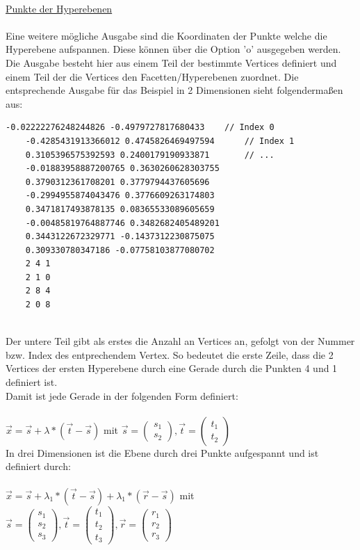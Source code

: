 \documentclass[12pt]{scrartcl}
\begin{document}
\ \\
\underline{Punkte der Hyperebenen}\\~\\
Eine weitere mögliche Ausgabe sind die Koordinaten der Punkte welche die Hyperebene aufspannen. Diese können über die Option 'o' ausgegeben werden. Die Ausgabe besteht hier aus einem Teil der bestimmte Vertices definiert und einem Teil der die Vertices den Facetten/Hyperebenen zuordnet. Die entsprechende Ausgabe für das Beispiel in 2 Dimensionen sieht folgendermaßen aus:

\begin{lstlisting}[style=Terminal, caption={Ausgabe von qconvex mit Option 'o'},captionpos=b]
    -0.02222276248244826 -0.4979727817680433    // Index 0
    -0.4285431913366012 0.4745826469497594      // Index 1
    0.3105396575392593 0.2400179190933871       // ...
    -0.01883958887200765 0.3630260628303755 
    0.3790312361708201 0.3779794437605696 
    -0.2994955874043476 0.3776609263174803 
    0.3471817493878135 0.08365533089605659 
    -0.00485819764887746 0.3482682405489201 
    0.3443122672329771 -0.1437312230875075 
    0.309330780347186 -0.07758103877080702 
    2 4 1 
    2 1 0 
    2 8 4 
    2 0 8 
\end{lstlisting}
\ \\
Der untere Teil gibt als erstes die Anzahl an Vertices an, gefolgt von der Nummer bzw. Index des entprechendem Vertex. So bedeutet die erste Zeile, dass die 2 Vertices der ersten Hyperebene durch eine Gerade durch die Punkten 4 und 1 definiert ist.\\
Damit ist jede Gerade in der folgenden Form definiert:\\~\\
$ \vec{x} = \vec{s} + \lambda * (\vec{t}-\vec{s})$ mit $\vec{s} = \begin{pmatrix} s_1 \\ s_2 \end{pmatrix}, \vec{t} = \begin{pmatrix} t_1 \\ t_2 \end{pmatrix}$
\ \\
In drei Dimensionen ist die Ebene durch drei Punkte aufgespannt und ist definiert durch:\\~\\
$ \vec{x} = \vec{s} + \lambda_1 * (\vec{t}-\vec{s}) + \lambda_1 * (\vec{r}-\vec{s})$ mit $\vec{s} = \begin{pmatrix} s_1 \\ s_2 \\ s_3 \end{pmatrix}, \vec{t} = \begin{pmatrix} t_1 \\ t_2 \\ t_3\end{pmatrix}, \vec{r} = \begin{pmatrix} r_1 \\ r_2 \\ r_3 \end{pmatrix}$
\end{document}
